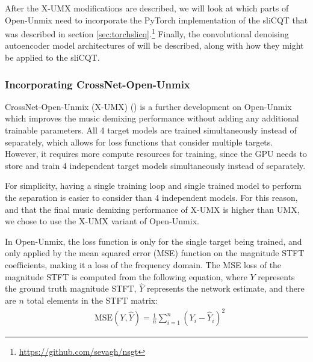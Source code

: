\documentclass[report.tex]{subfiles}
\begin{document}
After the X-UMX modifications are described, we will look at which parts of Open-Unmix need to incorporate the PyTorch implementation of the sliCQT that was described in section \ref{sec:torchslicq}.\footnote{\url{https://github.com/sevagh/nsgt}} Finally, the convolutional denoising autoencoder model architectures of \textcite{plumbley1, plumbley2}  will be described, along with how they might be applied to the sliCQT.

\subsubsection{Incorporating CrossNet-Open-Unmix}
\label{sec:xumxinc}

CrossNet-Open-Unmix (X-UMX) (\cite{xumx}) is a further development on Open-Unmix which improves the music demixing performance without adding any additional trainable parameters. All 4 target models are trained simultaneously instead of separately, which allows for loss functions that consider multiple targets. However, it requires more compute resources for training, since the GPU needs to store and train 4 independent target models simultaneously instead of separately.

For simplicity, having a single training loop and single trained model to perform the separation is easier to consider than 4 independent models. For this reason, and that the final music demixing performance of X-UMX is higher than UMX, we chose to use the X-UMX variant of Open-Unmix.

In Open-Unmix, the loss function is only for the single target being trained, and only applied by the mean squared error (MSE) function on the magnitude STFT coefficients, making it a loss of the frequency domain. The MSE loss of the magnitude STFT is computed from the following equation, where $Y$ represents the ground truth magnitude STFT, $\hat{Y}$ represents the network estimate, and there are $n$ total elements in the STFT matrix:
\begin{align}
	\nonumber & \text{MSE}(Y, \hat{Y}) = \frac{1}{n} \sum_{i = 1}^{n}{(Y_{i}-\hat{Y}_{i})^{2}}
\end{align}
\end{document}
